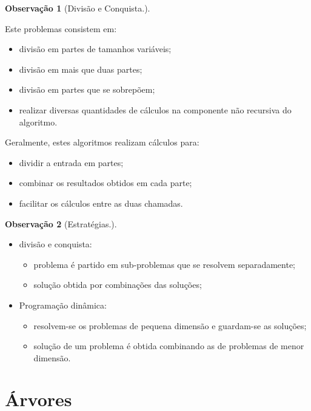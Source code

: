 \documentclass[a4paper, 12pt]{article}
\newtheorem{remark}{Observação}
\begin{document}
\begin{remark}[Divisão e Conquista.]\end{remark}
    Este problemas consistem em:
    \begin{itemize}
        \item divisão em partes de tamanhos variáveis;
        \item divisão em mais que duas partes;
        \item divisão em partes que se sobrepõem;
        \item realizar diversas quantidades de cálculos na componente não recursiva do algoritmo.
    \end{itemize}

    Geralmente, estes algoritmos realizam cálculos para:
    \begin{itemize}
        \item dividir a entrada em partes;
        \item combinar os resultados obtidos em cada parte;
        \item facilitar os cálculos entre as duas chamadas.
    \end{itemize}

\begin{remark}[Estratégias.]\end{remark}
    \begin{itemize}
        \item divisão e conquista:
        \begin{itemize}
            \item problema é partido em sub-problemas que se resolvem separadamente;
            \item solução obtida por combinações das soluções;
        \end{itemize}
        \item Programação dinâmica:
        \begin{itemize}
            \item  resolvem-se os problemas de pequena dimensão e guardam-se as soluções;
            \item solução de um problema é obtida combinando as de problemas de menor dimensão.
        \end{itemize}
    \end{itemize}


\section{Árvores}
\end{document}
